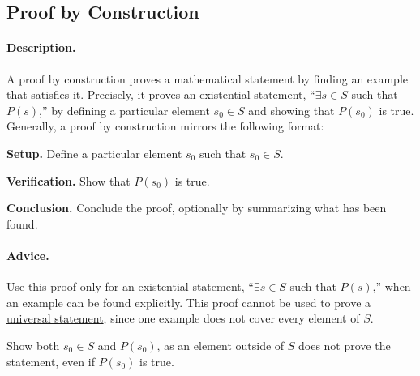 \subsection{Proof by Construction}
\label{subsections:techniques:existential:construction}



\paragraph{Description.}
A proof by construction proves a mathematical statement by finding %
an example that satisfies it. %
Precisely, it proves an existential statement, %
``$\exists s \in S$ such that $P(s)$,'' by defining a particular element %
$s_0 \in S$ and showing that $P(s_0)$ is true. %
Generally, a proof by construction mirrors the following format:
\begin{enumerate}{
    \item \textbf{Setup.} %
        Define a particular element $s_0$ such that $s_0 \in S$.
    \item \textbf{Verification.} %
        Show that $P(s_0)$ is true.
    \item \textbf{Conclusion.} %
        Conclude the proof, optionally by summarizing what has been found.
}
\end{enumerate}



\paragraph{Advice.}
\begin{itemize}{
    \item Use this proof only for an existential statement, %
        ``$\exists s \in S$ such that $P(s)$,'' %
        when an example can be found explicitly. %
        This proof cannot be used to prove a %
        \hyperref[sections:techniques:universal]{universal statement}, %
        since one example does not cover every element of $S$.
    \item Show both $s_0 \in S$ and $P(s_0)$, %
        as an element outside of $S$ does not prove the statement, %
        even if $P(s_0)$ is true.
}
\end{itemize}



